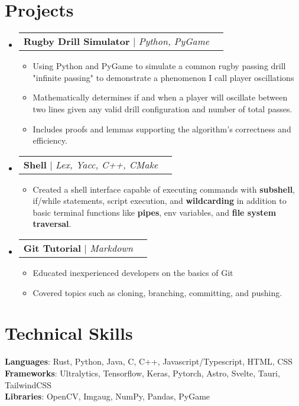 \documentclass[letterpaper,11pt]{article}
\makeatletter
\newcommand{\resumeItem}[1]{
  \item\small{
    {#1 \vspace{-2pt}}
  }
}
\newcommand{\resumeProjectHeading}[1]{
    \item
    \begin{tabular*}{0.97\textwidth}{l@{\extracolsep{\fill}}r}
      \small#1 \\
    \end{tabular*}\vspace{-8.5pt}
}
\newcommand{\resumeSubHeadingListStart}{\begin{itemize}[leftmargin=0.1in, label={}]}
\newcommand{\resumeSubHeadingListEnd}{\end{itemize}}
\newcommand{\resumeItemListStart}{\begin{itemize}}
\newcommand{\resumeItemListEnd}{\end{itemize}\vspace{-5pt}}
\makeatother
\begin{document}
\section{Projects}

    \resumeSubHeadingListStart
      \resumeProjectHeading
          {\textbf{Rugby Drill Simulator} $|$ \emph{Python, PyGame}}
          \resumeItemListStart
            \resumeItem{Using Python and PyGame to simulate a common rugby passing drill "infinite passing" to demonstrate a phenomenon I call player oscillations
            }
            \resumeItem{Mathematically determines if and when a player will oscillate between two lines given any valid drill configuration and number of total passes.}
            \resumeItem{Includes proofs and lemmas supporting the algorithm's correctness and efficiency. }
          \resumeItemListEnd

      \resumeProjectHeading
          {\textbf{Shell} $|$ \emph{Lex, Yacc, C++, CMake}}
          \resumeItemListStart
            \resumeItem{Created a shell interface capable of executing commands with \textbf{subshell}, if/while statements, script execution, and \textbf{wildcarding} in addition to basic terminal functions like \textbf{pipes}, env variables, and \textbf{file system traversal}.
            }
          \resumeItemListEnd
         
      \resumeProjectHeading
          {\textbf{Git Tutorial} $|$ \emph{Markdown}}
          \resumeItemListStart
            \resumeItem{Educated inexperienced developers on the basics of Git}
            \resumeItem{Covered topics such as cloning, branching, committing, and pushing.}
          \resumeItemListEnd
         
    \resumeSubHeadingListEnd


%
\section{Technical Skills}
 \begin{itemize}[leftmargin=0.15in, label={}]
    \small{\item{
     \textbf{Languages}{: Rust, Python, Java, C, C++, Javascript/Typescript, HTML, CSS} \\
     \textbf{Frameworks}{: Ultralytics, Tensorflow, Keras, Pytorch, Astro, Svelte, Tauri, TailwindCSS} \\
     \textbf{Libraries}{: OpenCV, Imgaug, NumPy, Pandas, PyGame} \\
    }}
 \end{itemize}


\end{document}
